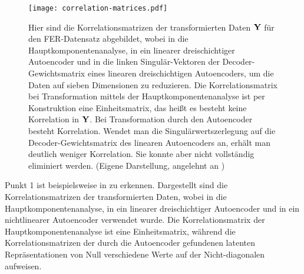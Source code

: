 \begin{figure}[ht]
	\centering
	\texttt{[image: correlation-matrices.pdf]}
	\caption[Korrelationsmatrizen der transformierten Daten $\mat{Y}$ für den FER-Datensatz von vier Methoden]{Hier sind die Korrelationsmatrizen der transformierten Daten $\mat{Y}$ für den FER-Datensatz abgebildet, wobei in \captiona die Hauptkomponentenanalyse, in \captionb ein linearer dreischichtiger Autoencoder und in \captionc die linken Singulär-Vektoren der Decoder-Gewichtsmatrix eines linearen dreischichtigen Autoencoders, um die Daten auf sieben Dimensionen zu reduzieren. Die Korrelationsmatrix bei Transformation mittels der Hauptkomponentenanalyse ist per Konstruktion eine Einheitsmatrix, das heißt es besteht keine Korrelation in $\mat{Y}$. Bei Transformation durch den Autoencoder besteht Korrelation. Wendet man die Singulärwertszerlegung auf die Decoder-Gewichtsmatrix des linearen Autoencoders an, erhält man deutlich weniger Korrelation. Sie konnte aber nicht vollständig eliminiert werden. (Eigene Darstellung, angelehnt an \textcite[5]{Plaut.2018})}
	\label{fig:Korrelationsmatrizen}
\end{figure}
Punkt 1 ist beispielsweise in  zu erkennen. Dargestellt sind die Korrelationsmatrizen der transformierten Daten, wobei in \captiona die Hauptkomponentenanalyse, in \captionb ein linearer dreischichtiger Autoencoder und in \captionc ein nichtlinearer Autoencoder verwendet wurde. Die Korrelationsmatrix der Hauptkomponentenanalyse ist eine Einheitsmatrix, während die Korrelationsmatrizen der durch die Autoencoder gefundenen latenten Repräsentationen von Null verschiedene Werte auf der Nicht-diagonalen aufweisen.

